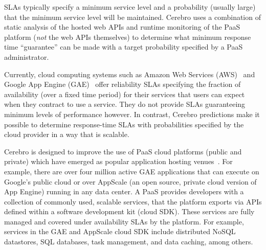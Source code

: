 SLAs typically specify a minimum service level and a
probability (usually large) that the minimum service level will be
maintained.  Cerebro uses a combination of static analysis of the hosted web APIs 
and runtime monitoring of the PaaS platform (\textit{not} the web APIs themselves) 
to determine what minimum response time ``guarantee'' can be made 
with a target probability specified by a PaaS administrator.  

Currently, cloud computing systems such as Amazon Web Services
(AWS)~\cite{amazon-aws-web} and
Google App Engine (GAE)~\cite{gae} offer reliability SLAs specifying the fraction of
availability (over a fixed time period) for their services
that users can expect when they contract to use a service. They do not provide SLAs
guaranteeing minimum levels of performance however.
In contrast, Cerebro predictions make it possible to determine response-time SLAs with
probabilities specified by the cloud provider in a way that is scalable.


Cerebro is designed to improve the use of PaaS cloud 
platforms (public and private) which have emerged as popular application
hosting venues~\cite{paas-growth}.
For example, there are over four million active GAE
applications that 
can execute on Google's public cloud or over AppScale (an open source, private 
cloud version of App Engine) running in any data center.
A PaaS provides developers 
with a collection of commonly used, scalable services,
that the platform exports via APIs defined within a software 
development kit (cloud SDK).  These services are fully managed and covered under 
availability SLAs by the platform. For example,  services 
in the GAE and AppScale cloud SDK
include distributed NoSQL datastores, SQL databases, task management, 
and data caching, among others. 

